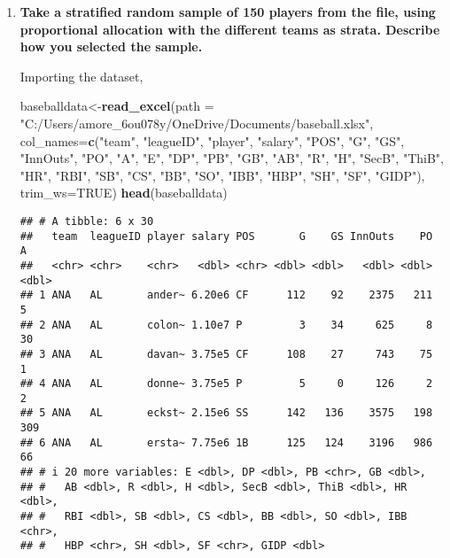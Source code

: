 \documentclass[]{article}
\newenvironment{Shaded}{\begin{snugshade}}{\end{snugshade}}
\newcommand{\AttributeTok}[1]{\textcolor[rgb]{0.13,0.29,0.53}{#1}}
\newcommand{\ConstantTok}[1]{\textcolor[rgb]{0.56,0.35,0.01}{#1}}
\newcommand{\FunctionTok}[1]{\textcolor[rgb]{0.13,0.29,0.53}{\textbf{#1}}}
\newcommand{\NormalTok}[1]{#1}
\newcommand{\OtherTok}[1]{\textcolor[rgb]{0.56,0.35,0.01}{#1}}
\newcommand{\StringTok}[1]{\textcolor[rgb]{0.31,0.60,0.02}{#1}}
\begin{document}
\begin{enumerate}[label=(\alph*)]

\item \textbf{Take a stratified random sample of 150 players from the file, using proportional allocation with the different teams as strata. Describe how you selected the sample.}

Importing the dataset, 


\begin{Shaded}
\begin{Highlighting}[]
\NormalTok{baseballdata}\OtherTok{\textless{}{-}}\FunctionTok{read\_excel}\NormalTok{(}\AttributeTok{path =} 
            \StringTok{"C:/Users/amore\_6ou078y/OneDrive/Documents/baseball.xlsx"}\NormalTok{, }
            \AttributeTok{col\_names=}\FunctionTok{c}\NormalTok{(}\StringTok{"team"}\NormalTok{, }\StringTok{"leagueID"}\NormalTok{, }\StringTok{"player"}\NormalTok{, }\StringTok{"salary"}\NormalTok{, }\StringTok{"POS"}\NormalTok{, }\StringTok{"G"}\NormalTok{, }
            \StringTok{"GS"}\NormalTok{, }\StringTok{"InnOuts"}\NormalTok{, }\StringTok{"PO"}\NormalTok{, }\StringTok{"A"}\NormalTok{, }\StringTok{"E"}\NormalTok{, }\StringTok{"DP"}\NormalTok{, }\StringTok{"PB"}\NormalTok{, }\StringTok{"GB"}\NormalTok{, }\StringTok{"AB"}\NormalTok{, }\StringTok{"R"}\NormalTok{, }
            \StringTok{"H"}\NormalTok{, }\StringTok{"SecB"}\NormalTok{, }\StringTok{"ThiB"}\NormalTok{, }\StringTok{"HR"}\NormalTok{, }\StringTok{"RBI"}\NormalTok{, }\StringTok{"SB"}\NormalTok{, }\StringTok{"CS"}\NormalTok{, }\StringTok{"BB"}\NormalTok{, }\StringTok{"SO"}\NormalTok{, }
            \StringTok{"IBB"}\NormalTok{, }\StringTok{"HBP"}\NormalTok{, }\StringTok{"SH"}\NormalTok{, }\StringTok{"SF"}\NormalTok{, }\StringTok{"GIDP"}\NormalTok{), }
            \AttributeTok{trim\_ws=}\ConstantTok{TRUE}\NormalTok{)}
\FunctionTok{head}\NormalTok{(baseballdata)}
\end{Highlighting}
\end{Shaded}

\begin{verbatim}
## # A tibble: 6 x 30
##   team  leagueID player salary POS       G    GS InnOuts    PO     A     
##   <chr> <chr>    <chr>   <dbl> <chr> <dbl> <dbl>   <dbl> <dbl> <dbl> 
## 1 ANA   AL       ander~ 6.20e6 CF      112    92    2375   211     5     
## 2 ANA   AL       colon~ 1.10e7 P         3    34     625     8    30     
## 3 ANA   AL       davan~ 3.75e5 CF      108    27     743    75     1     
## 4 ANA   AL       donne~ 3.75e5 P         5     0     126     2     2     
## 5 ANA   AL       eckst~ 2.15e6 SS      142   136    3575   198   309     
## 6 ANA   AL       ersta~ 7.75e6 1B      125   124    3196   986    66     
## # i 20 more variables: E <dbl>, DP <dbl>, PB <chr>, GB <dbl>, 
## #   AB <dbl>, R <dbl>, H <dbl>, SecB <dbl>, ThiB <dbl>, HR <dbl>, 
## #   RBI <dbl>, SB <dbl>, CS <dbl>, BB <dbl>, SO <dbl>, IBB <chr>, 
## #   HBP <chr>, SH <dbl>, SF <chr>, GIDP <dbl>
\end{verbatim} 


\end{enumerate}
\end{document}
